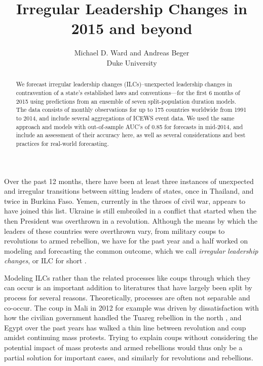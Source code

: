\documentclass[pdftex,11pt]{article}
\title{Irregular Leadership Changes in 2015 and beyond}
\author{Michael D. Ward and Andreas Beger \\
Duke University}
\date{\mydate{\today}}
\begin{document}
%
\setlength{\columnsep}{20pt}
\parindent=0.68cm

\maketitle
\begin{abstract}
We forecast irregular leadership changes (ILCs)--unexpected leadership changes in contravention of a state's established laws and conventions---for the first 6 months of 2015 using predictions from an ensemble of seven split-population duration models. The data consists of monthly observations for up to 175 countries worldwide from 1991 to 2014, and include several aggregations of ICEWS event data. We used the same approach and models with out-of-sample AUC's of 0.85 for forecasts in mid-2014, and include an assessment of their accuracy here, as well as several considerations and best practices for real-world forecasting.
\end{abstract}


\clearpage


%
%

Over the past 12 months, there have been at least three instances of unexpected and irregular transitions between sitting leaders of states, once in Thailand, and twice in Burkina Faso. Yemen, currently in the throes of civil war, appears to have joined this list. Ukraine is still embroiled in a conflict that started when the then President was overthrown in a revolution. Although the means by which the leaders of these countries were overthrown vary, from military coups to revolutions to armed rebellion, we have for the past year and a half worked on modeling and forecasting the common outcome, which we call \textit{irregular leadership changes}, or ILC for short \citep{beger:dorff:ward:2014b}.

Modeling ILCs rather than the related processes like coups through which they can occur is an important addition to literatures that have largely been split by process for several reasons. Theoretically, processes are often not separable and co-occur. The coup in Mali in 2012 for example was driven by dissatisfaction with how the civilian government handled the Tuareg rebellion in the north \citep{nossiter:2012}, and Egypt over the past years has walked a thin line between revolution and coup amidst continuing mass protests. Trying to explain coups without considering the potential impact of mass protests and armed rebellions would thus only be a partial solution for important cases, and similarly for revolutions and rebellions. 
\end{document}
